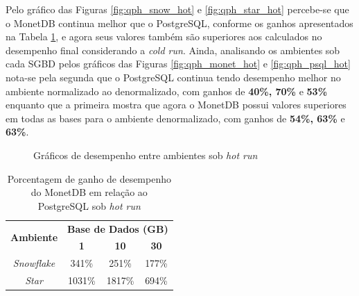 Pelo gráfico das Figuras \ref{fig:qph_snow_hot} e \ref{fig:qph_star_hot} percebe-se que o MonetDB continua melhor que o PostgreSQL, conforme os ganhos apresentados na Tabela \ref{tab:ganho_monet_psql_hot}, e agora seus valores também são superiores aos calculados no desempenho final considerando a \textit{cold run}. Ainda, analisando os ambientes sob cada SGBD pelos gráficos das Figuras \ref{fig:qph_monet_hot} e \ref{fig:qph_psql_hot} nota-se pela segunda que o PostgreSQL continua tendo desempenho melhor no ambiente normalizado ao denormalizado, com ganhos de \textbf{40\%, 70\%} e \textbf{53\%} enquanto que a primeira mostra que agora o MonetDB possui valores superiores em todas as bases para o ambiente denormalizado, com ganhos de \textbf{54\%, 63\%} e \textbf{63\%}.

\begin{figure}[htpb]
        \centering
        \caption{Gráficos de desempenho entre ambientes sob \textit{hot run}}
        \label{fig:qph_model_hot}
\end{figure}

\begin{table}[htpb]
        \centering
        \caption{Porcentagem de ganho de desempenho do MonetDB em relação ao PostgreSQL sob \textit{hot run}}
        \label{tab:ganho_monet_psql_hot}
        \begin{tabular}{|c|c|c|c|}
        \hline
        \multirow{2}{*}{\textbf{Ambiente}} & \multicolumn{3}{c|}{\textbf{Base de Dados (GB)}} \\ \cline{2-4} 
        & \textbf{1}     & \textbf{10}    & \textbf{30}    \\ \hline
        \textit{Snowflake}                 & 341\%          & 251\%          & 177\%          \\ \hline
        \textit{Star}                      & 1031\%         & 1817\%         & 694\%          \\ \hline
        \end{tabular}
\end{table}
    
